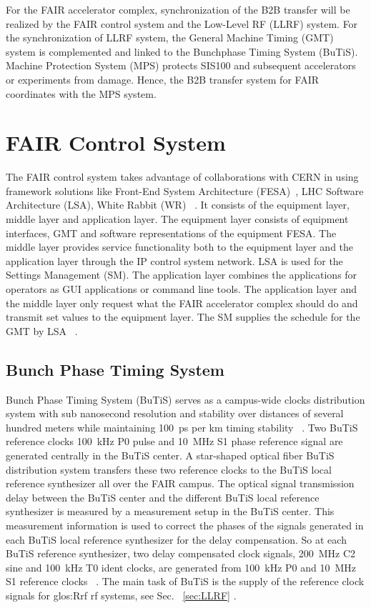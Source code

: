 
For the FAIR accelerator complex, synchronization of the B2B transfer will be realized by the FAIR control system and the Low-Level RF (LLRF) system. For the synchronization of LLRF system, the General Machine Timing (\gls{GMT}) system is complemented and linked to the Bunchphase Timing System (BuTiS). Machine Protection System (MPS) protects SIS100 and subsequent accelerators or experiments from damage. Hence, the B2B transfer system for FAIR coordinates with the MPS system. 
\section{FAIR Control System}
The \gls{FAIR} control system takes advantage of collaborations with CERN in using framework solutions like Front-End System Architecture (\gls{FESA})~\cite{hoffmann_fesafront-end_2008}, LHC Software Architecture (\gls{LSA}), White Rabbit (\gls{WR}) ~\cite{huhmann_fair_2013}. It consists of the equipment layer, middle layer and application layer. The equipment layer consists of equipment interfaces, GMT and software representations of the equipment FESA. The middle layer provides service functionality both to the equipment layer and the application layer through the IP control system network. LSA is used for the Settings Management (SM). The application layer combines the applications for operators as \gls{GUI} applications or command line tools. The application layer and the middle layer only request what the FAIR accelerator complex should do and transmit set values to the equipment layer. The \gls{SM} supplies the schedule for the GMT by LSA ~\cite{huhmann_fair_2013, beck_new_2012}.

\subsection{Bunch Phase Timing System}
Bunch Phase Timing System (BuTiS) serves as a campus-wide clocks distribution system with sub nanosecond resolution and stability over distances of several hundred meters while maintaining \SI{100}{ps} per km timing stability ~\cite{moritz_butisdevelopment_2006}. Two BuTiS reference clocks \SI{100}{kHz} P0 pulse and \SI{10}{MHz} S1 phase reference signal are generated centrally in the BuTiS center. A star-shaped optical fiber BuTiS distribution system transfers these two reference clocks to the BuTiS local reference synthesizer all over the FAIR campus. The optical signal transmission delay between the BuTiS center and the different BuTiS local reference synthesizer is measured by a measurement setup in the BuTiS center. This measurement information is used to correct the phases of the signals generated in each BuTiS local reference synthesizer for the delay compensation. So at each BuTiS reference synthesizer, two delay compensated clock signals, \SI{200}{MHz} C2 sine and \SI{100}{kHz} T0 ident clocks, are generated from \SI{100}{kHz} P0 and \SI{10}{MHz} S1 reference clocks ~\cite{moritz_butisdevelopment_2006, zipfel_recent_2011}. The main task of BuTiS is the supply of the reference clock signals for \gls{glos:Rrf} rf systems, see Sec. ~\ref{sec:LLRF} .

